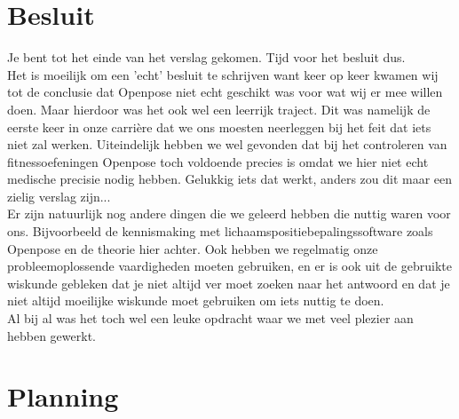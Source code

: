 \documentclass[a4paper,twoside,kulak]{kulakreport}
\begin{document}
\chapter*{Besluit}
Je bent tot het einde van het verslag gekomen. Tijd voor het besluit dus.\\
Het is moeilijk om een 'echt' besluit te schrijven want keer op keer kwamen wij tot de conclusie dat Openpose niet echt geschikt was voor wat wij er mee willen doen. Maar hierdoor was het ook wel een leerrijk traject. Dit was namelijk de eerste keer in onze carrière dat we ons moesten neerleggen bij het feit dat iets niet zal werken. Uiteindelijk hebben we  wel gevonden dat bij het controleren van fitnessoefeningen Openpose  toch voldoende precies is omdat we hier niet echt medische precisie nodig hebben. Gelukkig iets dat werkt, anders zou dit maar een zielig verslag zijn... \\
Er zijn natuurlijk nog andere dingen die we  geleerd hebben die nuttig waren voor ons. Bijvoorbeeld de kennismaking met lichaamspositiebepalingssoftware zoals Openpose en de theorie hier achter. Ook hebben we regelmatig onze probleemoplossende vaardigheden moeten gebruiken, en er is ook uit de gebruikte wiskunde gebleken dat je niet altijd ver moet zoeken naar het antwoord en dat je niet altijd moeilijke wiskunde moet gebruiken om iets nuttig te doen.\\
Al bij al was het toch wel een leuke opdracht waar we met veel plezier aan hebben gewerkt.

\chapter{Planning}
\end{document}
